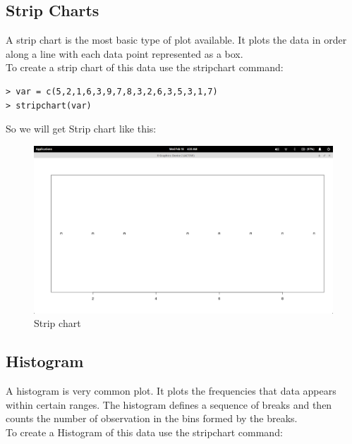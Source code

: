\clearpage

\subsection{Strip Charts}

A strip chart is the most basic type of plot available. It plots the data in order along a line with each data point represented as a box.\\

To create a strip chart of this data use the stripchart command:\\

\begin{lstlisting}[frame=single]
> var = c(5,2,1,6,3,9,7,8,3,2,6,3,5,3,1,7)
> stripchart(var)
\end{lstlisting} 

So we will get Strip chart like this:\\

 
\begin{figure}[h!]
\includegraphics[scale=0.35]{strip_plot.png}
  \centering
  \caption{Strip chart}
  \label{fig:barchart1}
\end{figure}

\clearpage

\subsection{Histogram}

A histogram is very common plot. It plots the frequencies that data appears within certain ranges.
The histogram defines a sequence of breaks and then counts the number of observation in the bins formed by the breaks. \\ 
To create a Histogram of this data use the stripchart command:\\

